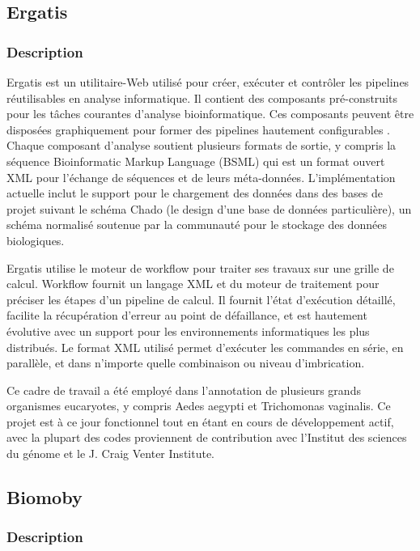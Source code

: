\subsection{Ergatis}
\subsubsection{Description}

Ergatis est un utilitaire-Web  utilisé pour créer, exécuter et contrôler les pipelines réutilisables en analyse informatique. Il contient des composants pré-construits pour les tâches courantes d'analyse bioinformatique. Ces composants peuvent être disposées graphiquement pour former des pipelines hautement configurables . Chaque composant d'analyse soutient plusieurs formats de sortie, y compris la séquence Bioinformatic Markup Language (BSML) qui est un format ouvert XML pour l'échange de séquences et de leurs méta-données. L'implémentation actuelle inclut le support pour le chargement des données dans des bases de projet suivant le schéma Chado (le design d'une base de données particulière), un schéma normalisé soutenue par la communauté  pour le stockage des données biologiques.

Ergatis utilise le moteur de workflow pour traiter ses travaux sur une grille de calcul. Workflow fournit un langage XML et du moteur de traitement pour préciser les étapes d'un pipeline de calcul. Il fournit l'état d'exécution détaillé, facilite la récupération d'erreur au point de défaillance, et est hautement évolutive avec un support pour les environnements informatiques les plus distribués. Le format XML utilisé permet d'exécuter les commandes  en série, en parallèle, et dans n'importe quelle combinaison ou niveau d'imbrication.

Ce cadre de travail a été employé dans l'annotation de plusieurs grands organismes eucaryotes, y compris Aedes aegypti et Trichomonas vaginalis.
Ce projet est à ce jour fonctionnel tout en étant en cours de développement actif, avec la plupart des codes proviennent de contribution avec l'Institut des sciences du génome et le J. Craig Venter Institute.

\subsection{Biomoby}
\subsubsection{Description}

